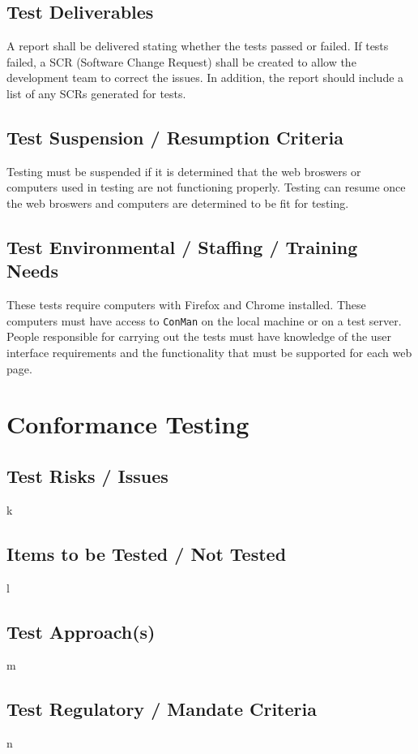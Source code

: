 \documentclass{article}
\begin{document}
\subsection{Test Deliverables}
A report shall be delivered stating whether the tests passed or failed. If tests 
failed, a SCR (Software Change Request) shall be created to allow the development 
team to correct the issues. In addition, the report should include a list of any 
SCRs generated for tests.

\subsection{Test Suspension / Resumption Criteria}
Testing must be suspended if it is determined that the web broswers or computers 
used in testing are not functioning properly. Testing can resume once the web 
broswers and computers are determined to be fit for testing. 

\subsection{Test Environmental / Staffing / Training Needs}
These tests require computers with Firefox and Chrome installed. These computers 
must have access to \texttt{ConMan} on the local machine or on a test server. People 
responsible for carrying out the tests must have knowledge of the user interface 
requirements and the functionality that must be supported for each web page.

\newpage
\section{Conformance Testing}
\subsection{Test Risks / Issues}
k

\subsection{Items to be Tested / Not Tested}
l 

\subsection{Test Approach(s)}
m 

\subsection{Test Regulatory / Mandate Criteria}
n
\end{document}
